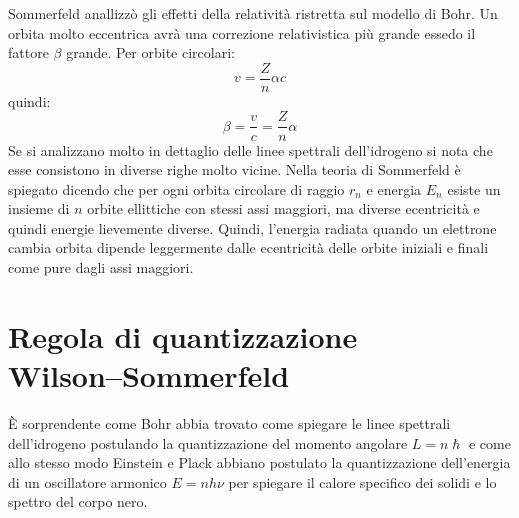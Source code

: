 Sommerfeld anallizzò gli effetti della relatività ristretta sul modello di Bohr. Un orbita molto eccentrica avrà una correzione relativistica più grande essedo il fattore $\beta$ grande. Per orbite circolari:
\begin{equation}
v=\frac{Z}{n}\alpha c
\end{equation}
quindi:
\begin{equation}
\beta=\frac{v}{c}=\frac{Z}{n}\alpha
\label{betabohr}
\end{equation}
Se si analizzano molto in dettaglio delle linee spettrali dell'idrogeno si nota che esse consistono in diverse righe molto vicine. Nella teoria di Sommerfeld è spiegato dicendo che per ogni orbita circolare di raggio $r_n$ e energia $E_n$ esiste un insieme di $n$ orbite ellittiche con stessi assi maggiori, ma diverse ecentricità e quindi energie lievemente diverse. Quindi, l'energia radiata quando un elettrone cambia orbita dipende leggermente dalle ecentricità delle orbite iniziali e finali come pure dagli assi maggiori.
\section[Regola di quantizzazione Wilson--Sommerfeld]{Regola di quantizzazione\\ Wil\-son--Som\-mer\-feld}
\`E sorprendente come Bohr abbia trovato come spiegare le linee spettrali dell'idrogeno postulando la quantizzazione del momento angolare $L=n\hslash$ e come allo stesso modo Einstein e Plack abbiano postulato la quantizzazione dell'energia di un oscillatore armonico $E=nh\nu$ per spiegare il calore specifico dei solidi e lo spettro del corpo nero.

